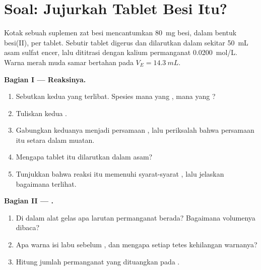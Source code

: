 \section{Soal: Jujurkah Tablet Besi Itu?}

\begin{problem}
\label{pb:g11:titration:1}
Kotak sebuah suplemen zat besi mencantumkan \qty{80}{mg} besi, dalam
bentuk besi(II), per tablet. Sebutir tablet digerus dan dilarutkan dalam
sekitar \qty{50}{mL} asam sulfat encer, lalu dititrasi dengan kalium
permanganat \qty{0.0200}{mol/L}. Warna merah muda samar bertahan pada
$V_E = \qty{14.3}{mL}$.

\medskip
\noindent\textbf{Bagian I --- Reaksinya.}
\begin{enumerate}
  \item Sebutkan kedua  yang terlibat. Spesies mana yang
        , mana yang ?
  \item Tuliskan kedua .
  \item Gabungkan keduanya menjadi persamaan , lalu periksalah
        bahwa persamaan itu setara dalam muatan.
  \item Mengapa tablet itu dilarutkan dalam asam?
  \item Tunjukkan bahwa reaksi itu memenuhi syarat-syarat , lalu
        jelaskan bagaimana  terlihat.
\end{enumerate}

\medskip
\noindent\textbf{Bagian II --- .}
\begin{enumerate}[resume]
  \item Di dalam alat gelas apa larutan permanganat berada? Bagaimana
        volumenya dibaca?
  \item Apa warna isi labu sebelum , dan mengapa setiap
        tetes kehilangan warnanya?
  \item Hitung jumlah permanganat yang dituangkan pada .
\end{enumerate}


\end{problem}
